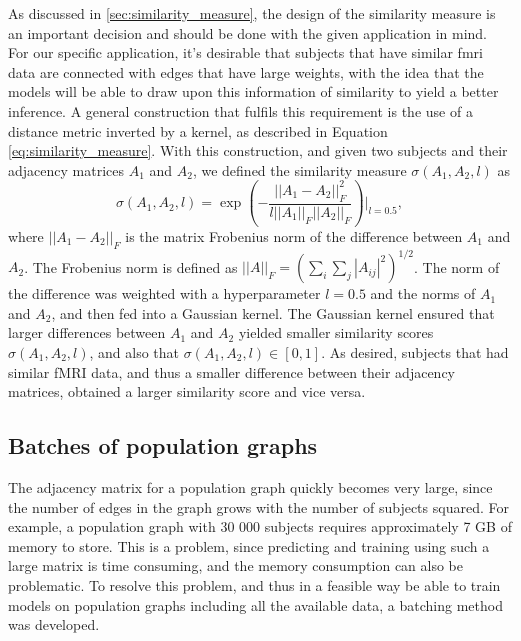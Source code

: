 As discussed in \cref{sec:similarity_measure}, the design of the similarity measure is an important decision and should be done with the given application in mind. For our specific application, it's desirable that subjects that have similar \acrshort{fmri} data are connected with edges that have large weights, with the idea that the models will be able to draw upon this information of similarity to yield a better inference. A general construction that fulfils this requirement is the use of a distance metric inverted by a kernel, as described in Equation \eqref{eq:similarity_measure}. With this construction, and given two subjects and their adjacency matrices $A_1$ and $A_2$, we defined the similarity measure $\sigma\left(A_1, A_2, l\right)$ as
\begin{equation}
    \sigma\left(A_1, A_2, l\right) = \exp{\left(- \frac{||A_1 - A_2||_F^2}{l||A_1||_F ||A_2||_F} \right)}\biggr\rvert_{l=0.5},
    \label{eq:modified_similarity_measure}
\end{equation}
where $||A_1 - A_2 ||_F$ is the matrix Frobenius norm of the difference between $A_1$ and $A_2$. The Frobenius norm is defined as $||A||_F = \left( \sum_i \sum_j |A_{ij}|^2 \right)^{1/2}$. The norm of the difference was weighted with a hyperparameter $l=0.5$ and the norms of $A_1$ and $A_2$, and then fed into a Gaussian kernel. The Gaussian kernel ensured that larger differences between $A_1$ and $A_2$ yielded smaller similarity scores $\sigma\left(A_1, A_2, l\right)$, and also that  $\sigma\left(A_1, A_2, l\right) \in \left[0, 1\right]$. As desired, subjects that had similar fMRI data, and thus a smaller difference between their adjacency matrices, obtained a larger similarity score and vice versa. 


\subsection{Batches of population graphs}
The adjacency matrix for a population graph quickly becomes very large, since the number of edges in the graph grows with the number of subjects squared. For example, a population graph with 30 000 subjects requires approximately 7 GB of memory to store. This is a problem, since predicting and training using such a large matrix is time consuming, and the memory consumption can also be problematic. To resolve this problem, and thus in a feasible way be able to train models on population graphs including all the available data, a batching method was developed. 

